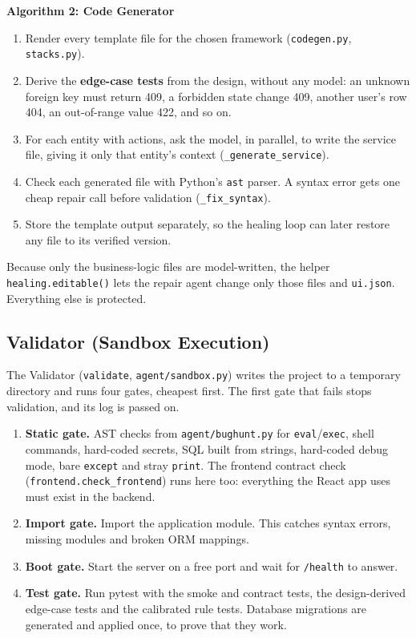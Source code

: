 \documentclass[12pt,a4paper]{report}
\begin{document}
\noindent\textbf{Algorithm 2: Code Generator}
\begin{enumerate}
    \item Render every template file for the chosen framework (\texttt{codegen.py}, \texttt{stacks.py}).
    \item Derive the \textbf{edge-case tests} from the design, without any model: an unknown foreign key must return 409, a forbidden state change 409, another user's row 404, an out-of-range value 422, and so on.
    \item For each entity with actions, ask the model, in parallel, to write the service file, giving it only that entity's context (\texttt{\_generate\_service}).
    \item Check each generated file with Python's \texttt{ast} parser. A syntax error gets one cheap repair call before validation (\texttt{\_fix\_syntax}).
    \item Store the template output separately, so the healing loop can later restore any file to its verified version.
\end{enumerate}

Because only the business-logic files are model-written, the helper \texttt{healing.editable()} lets the repair agent change only those files and \texttt{ui.json}. Everything else is protected.

\subsection{Validator (Sandbox Execution)}

The Validator (\texttt{validate}, \texttt{agent/sandbox.py}) writes the project to a temporary directory and runs four gates, cheapest first. The first gate that fails stops validation, and its log is passed on.

\begin{enumerate}
    \item \textbf{Static gate.} AST checks from \texttt{agent/bughunt.py} for \texttt{eval}/\texttt{exec}, shell commands, hard-coded secrets, SQL built from strings, hard-coded debug mode, bare \texttt{except} and stray \texttt{print}. The frontend contract check (\texttt{frontend.check\_frontend}) runs here too: everything the React app uses must exist in the backend.
    \item \textbf{Import gate.} Import the application module. This catches syntax errors, missing modules and broken ORM mappings.
    \item \textbf{Boot gate.} Start the server on a free port and wait for \texttt{/health} to answer.
    \item \textbf{Test gate.} Run pytest \cite{pytest} with the smoke and contract tests, the design-derived edge-case tests and the calibrated rule tests. Database migrations are generated and applied once, to prove that they work.
\end{enumerate}
\end{document}
